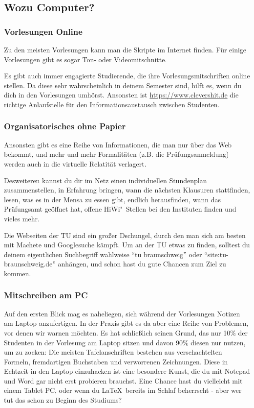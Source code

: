 	\subsection{Wozu Computer?}
		\subsubsection{Vorlesungen Online}
			Zu den meisten Vorlesungen kann man die Skripte im Internet finden. Für einige Vorlesungen gibt es sogar Ton- oder Videomitschnitte.

			Es gibt auch immer engagierte Studierende, die ihre Vorlesungsmitschriften online stellen. Da diese sehr wahrscheinlich in deinem Semester sind, hilft es, wenn du dich in den Vorlesungen umhörst. Ansonsten ist \url{https://www.clevershit.de} die richtige Anlaufstelle für den Informationsaustausch zwischen Studenten.

		\subsubsection{Organisatorisches ohne Papier}
			Ansonsten gibt es eine Reihe von Informationen, die man nur über das Web bekommt, und mehr und mehr Formalitäten (z.B. die Prüfungsanmeldung) werden auch in die virtuelle Relatität verlagert.

			Desweiteren kannst du dir im Netz einen individuellen Stundenplan zusammenstellen, in Erfahrung bringen, wann die nächsten Klausuren stattfinden, lesen, was es in der Mensa zu essen gibt, endlich herausfinden, wann das Prüfungsamt geöffnet hat,  offene HiWi"~Stellen bei den Instituten finden und vieles mehr.

			Die Webseiten der TU sind ein großer Dschungel, durch den man sich am besten  mit Machete und Googlesuche kämpft. Um an der TU etwas zu finden, solltest du deinem eigentlichen Suchbegriff wahlweise \enquote{tu braunschweig} oder \enquote{site:tu-braunschweig.de} anhängen, und schon hast du gute Chancen zum Ziel zu kommen.

		\subsubsection{Mitschreiben am PC}
			Auf den ersten Blick mag es naheliegen, sich
			während der Vorlesungen Notizen  am Laptop
			anzufertigen. In der Praxis gibt es da aber eine
			Reihe von Problemen, vor denen wir  warnen
			möchten. Es hat schließlich seinen Grund, das
			nur 10\% der Studenten in der Vorlesung am
			Laptop sitzen und davon 90\% diesen nur nutzen,
			um zu zocken: Die meisten Tafelanschriften
			bestehen  aus verschachtelten Formeln,
			fremdartigen Buchstaben und verworrenen
			Zeichnungen. Diese in Echtzeit in den Laptop
			einzuhacken ist eine besondere Kunst, die du mit
			Notepad und Word gar nicht erst probieren
			brauchst. Eine Chance hast du vielleicht mit
			einem Tablet PC, oder wenn du
			\LaTeX\ bereits im Schlaf beherrscht -
			aber wer tut das schon zu Beginn des Studiums?

